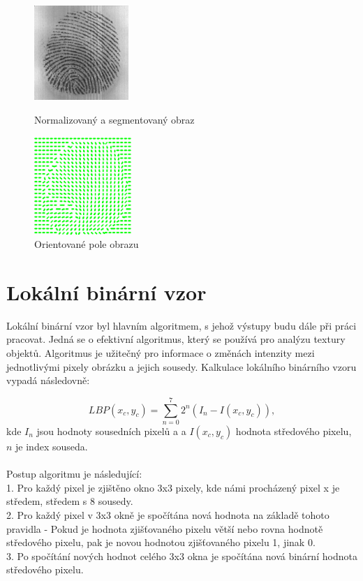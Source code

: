 \begin{figure}[htbp]
  \begin{minipage}[b]{0.5\linewidth}
    \centering
    \includegraphics[width=135px]{obrazky-figures/norm_img.png}
    \caption{Normalizovaný a segmentovaný obraz}
  \end{minipage}
  \hspace{0.5cm}
  \begin{minipage}[b]{0.5\linewidth}
    \centering
    \includegraphics[width=140px]{obrazky-figures/orient.png}
    \caption{Orientované pole obrazu}
  \end{minipage}
\end{figure}



\section{Lokální binární vzor}
Lokální binární vzor byl hlavním algoritmem, s jehož výstupy budu dále při práci pracovat. Jedná se o efektivní algoritmus, který se používá pro analýzu textury objektů.  Algoritmus je užitečný pro informace o změnách intenzity mezi jednotlivými pixely obrázku a jejich sousedy. Kalkulace lokálního binárního vzoru vypadá následovně:\cite{GaikwadStudy}

$$LBP(x_c,y_c) = \sum_{n=0}^{7}2^n(I_n-I(x_c,y_c)),$$
kde $I_n$ jsou hodnoty sousedních pixelů a a $I(x_c,y_c)$ hodnota středového pixelu, $n$ je index souseda.\\\\
Postup algoritmu je následující:\\
1. Pro každý pixel je zjištěno okno 3x3 pixely, kde námi procházený pixel x je středem, středem s 8 sousedy.\\
2. Pro každý pixel v 3x3 okně je spočítána nová hodnota na základě tohoto pravidla - Pokud je hodnota zjišťovaného pixelu větší nebo rovna hodnotě středového pixelu, pak je novou hodnotou zjišťovaného pixelu 1, jinak 0.\\
3. Po spočítání nových hodnot celého 3x3 okna je spočítána nová binární hodnota středového pixelu.\\

